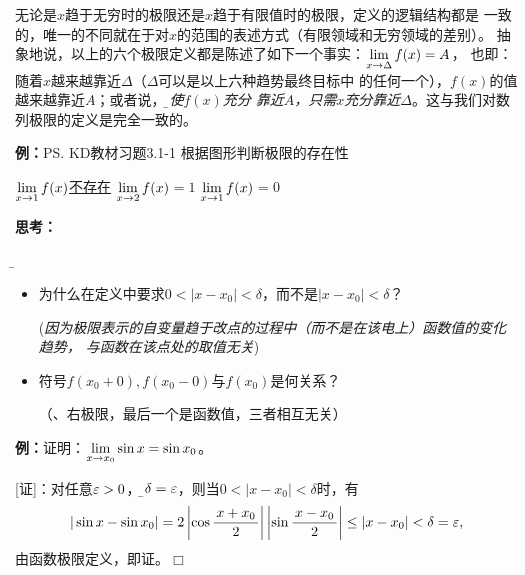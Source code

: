 无论是$x$趋于无穷时的极限还是$x$趋于有限值时的极限，定义的逻辑结构都是
一致的，唯一的不同就在于对$x$的范围的表述方式（有限领域和无穷领域的差别）。
抽象地说，以上的六个极限定义都是陈述了如下一个事实：$\lim\limits_{x\to{\Delta}}f(x)=A$，
也即：随着$x$越来越靠近$\Delta$（$\Delta$可以是以上六种趋势最终目标中
的任何一个），$f(x)$的值越来越靠近$A$；或者说，{\it\b 要使$f(x)$充分
靠近$A$，只需$x$充分靠近$\Delta$}。这与我们对数列极限的定义是完全一致的。

{\bf 例：}\ps{KD教材习题3.1-1}
根据图形判断极限的存在性
\begin{center}
	
	$\lim\limits_{x\to{1}}f(x)$\underline{不存在}
	\quad $\lim\limits_{x\to{2}}f(x)$\underline{$=1$}
	\quad $\lim\limits_{x\to{1}}f(x)$\underline{$=0$}
\end{center}

{\bf 思考：}{\b
	\begin{itemize}
	  \setlength{\itemindent}{1cm}
	  \item 为什么在定义中要求$0<|x-x_0|<\delta$，而不是$|x-x_0|<\delta$？
	  
	   \quad ({\it 因为极限表示的自变量趋于改点的过程中（而不是在该电上）函数值的变化趋势，
	   与函数在该点处的取值无关})
	  \item 符号$f(x_0+0),f(x_0-0)$与$f(x_0)$是何关系？
	  
	  \quad （{、右极限，最后一个是函数值，三者相互无关}）
	\end{itemize}
}

{\bf 例：}证明：$\lim\limits_{x\to{x_0}}\sin x=\sin x_0$。

[证]：对任意$\varepsilon>0$，令{\b$\delta=\varepsilon$}，则当$0<|x-x_0|<\delta$时，有
$$|\sin x-\sin x_0|=2\left|\cos\displaystyle\frac{\,{x+x_0}\,}{\,{2}\,}\right|
\left|\sin\displaystyle\frac{\,{x-x_0}\,}{\,{2}\,}\right|\leq|x-x_0|<\delta=\varepsilon,$$
由函数极限定义，即证。\hfill $\Box$

